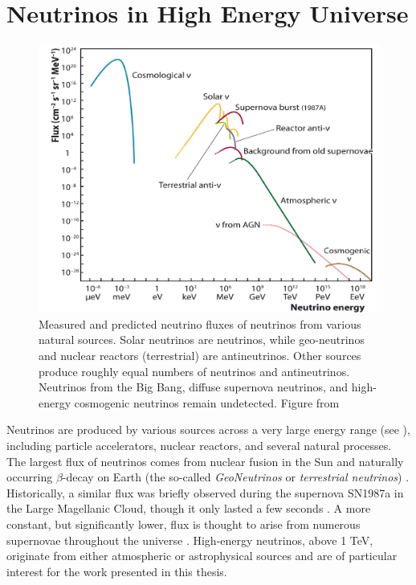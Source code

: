 \setchapterpreamble[u]{\margintoc}
\chapter{Neutrinos in High Energy Universe}
\begin{figure}[h]
    \caption{Measured and predicted neutrino fluxes of neutrinos from various natural sources. Solar neutrinos are neutrinos, while geo-neutrinos and nuclear reactors (terrestrial) are antineutrinos. Other sources produce roughly equal numbers of neutrinos and antineutrinos. Neutrinos from the Big Bang, diffuse supernova neutrinos, and high-energy cosmogenic neutrinos remain undetected. Figure from \cite{KATZ2012651}}
    \includegraphics{./figures/nu_phenomenology/all-nu-spectrum-mod.png}
\end{figure}
Neutrinos are produced by various sources across a very large energy range (see ), including particle accelerators, nuclear reactors, and several natural processes. The largest flux of neutrinos comes from nuclear fusion in the Sun  and naturally occurring $\beta$-decay on Earth (the so-called \emph{GeoNeutrinos} or \emph{terrestrial neutrinos}) . Historically, a similar flux was briefly observed during the supernova SN1987a in the Large Magellanic Cloud, though it only lasted a few seconds . A more constant, but significantly lower, flux is thought to arise from numerous supernovae throughout the universe . High-energy neutrinos, above 1 TeV, originate from either atmospheric or astrophysical sources and are of particular interest for the work presented in this thesis. 

